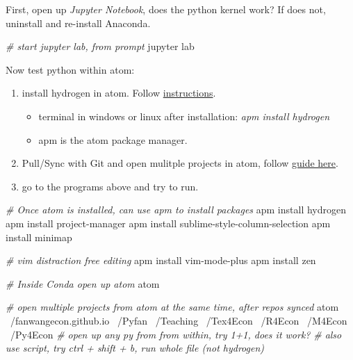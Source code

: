 \documentclass[]{article}
\newenvironment{Shaded}{\begin{snugshade}}{\end{snugshade}}
\newcommand{\CommentTok}[1]{\textcolor[rgb]{0.56,0.35,0.01}{\textit{#1}}}
\newcommand{\ExtensionTok}[1]{#1}
\newcommand{\FunctionTok}[1]{\textcolor[rgb]{0.00,0.00,0.00}{#1}}
\newcommand{\NormalTok}[1]{#1}
\providecommand{\tightlist}{%
  \setlength{\itemsep}{0pt}\setlength{\parskip}{0pt}}
\begin{document}
First, open up \emph{Jupyter Notebook}, does the python kernel work? If
does not, uninstall and re-install Anaconda.

\begin{Shaded}
\begin{Highlighting}[]
\CommentTok{# start jupyter lab, from prompt}
\ExtensionTok{jupyter}\NormalTok{ lab}
\end{Highlighting}
\end{Shaded}

Now test python within atom:

\begin{enumerate}
\def\labelenumi{\arabic{enumi}.}
\tightlist
\item
  install hydrogen in atom. Follow
  \href{http://nteract.io/atom}{instructions}.

  \begin{itemize}
  \tightlist
  \item
    terminal in windows or linux after installation: \emph{apm install
    hydrogen}
  \item
    apm is the atom package manager.
  \end{itemize}
\item
  Pull/Sync with Git and open mulitple projects in atom, follow
  \href{https://fanwangecon.github.io/Tex4Econ/nontex/install/git/fs_git_setup.html}{guide
  here}.
\item
  go to the programs above and try to run.
\end{enumerate}

\begin{Shaded}
\begin{Highlighting}[]
\CommentTok{# Once atom is installed, can use apm to install packages}
\FunctionTok{apm}\NormalTok{ install hydrogen}
\FunctionTok{apm}\NormalTok{ install project-manager}
\FunctionTok{apm}\NormalTok{ install sublime-style-column-selection}
\FunctionTok{apm}\NormalTok{ install minimap}

\CommentTok{# vim distraction free editing}
\FunctionTok{apm}\NormalTok{ install vim-mode-plus}
\FunctionTok{apm}\NormalTok{ install zen}

\CommentTok{# Inside Conda open up atom}
\ExtensionTok{atom}

\CommentTok{# open multiple projects from atom at the same time, after repos synced}
\ExtensionTok{atom}\NormalTok{ ~/fanwangecon.github.io ~/Pyfan ~/Teaching ~/Tex4Econ ~/R4Econ ~/M4Econ ~/Py4Econ}
\CommentTok{# open up any py from from within, try 1+1, does it work?}
\CommentTok{# also use script, try ctrl + shift + b, run whole file (not hydrogen)}
\end{Highlighting}
\end{Shaded}
\end{document}
